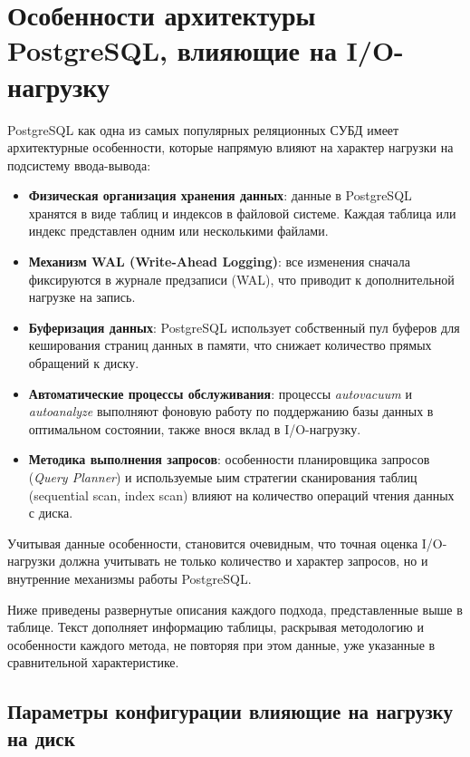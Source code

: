 \section{Особенности архитектуры PostgreSQL, влияющие на I/O-нагрузку}

PostgreSQL как одна из самых популярных реляционных СУБД имеет архитектурные особенности, которые напрямую влияют на характер нагрузки на подсистему ввода-вывода:

\begin{itemize}
    \item \textbf{Физическая организация хранения данных}: данные в PostgreSQL хранятся в виде таблиц и индексов в файловой системе. Каждая таблица или индекс представлен одним или несколькими файлами.
    \item \textbf{Механизм WAL (Write-Ahead Logging)}: все изменения сначала фиксируются в журнале предзаписи (WAL), что приводит к дополнительной нагрузке на запись.
    \item \textbf{Буферизация данных}: PostgreSQL использует собственный пул буферов для кеширования страниц данных в памяти, что снижает количество прямых обращений к диску.
    \item \textbf{Автоматические процессы обслуживания}: процессы \textit{autovacuum} и \textit{autoanalyze} выполняют фоновую 
                                работу по поддержанию базы данных в оптимальном состоянии, также внося вклад в I/O-нагрузку.
    \item \textbf{Методика выполнения запросов}: особенности планировщика запросов (\textit{Query Planner}) и используемые 
            ыим стратегии сканирования таблиц (sequential scan, index scan) влияют на количество операций чтения данных с диска.
\end{itemize}

Учитывая данные особенности, становится очевидным, что точная оценка I/O-нагрузки должна учитывать не только количество и 
характер запросов, но и внутренние механизмы работы PostgreSQL.

Ниже приведены развернутые описания каждого подхода, представленные выше в таблице. Текст дополняет информацию таблицы, 
раскрывая методологию и особенности каждого метода, не повторяя при этом данные, уже указанные в сравнительной характеристике.


\subsection{Параметры конфигурации влияющие на нагрузку на диск}

